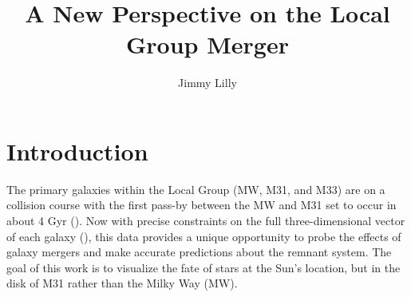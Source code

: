 \documentclass{aastex63}
\begin{document}
\title{A New Perspective on the Local Group Merger}

\author{Jimmy Lilly}


\section{Introduction} \label{sec:intro}
The primary galaxies within the Local Group (MW, M31, and M33) are on a collision course with the first pass-by between the MW and M31 set to occur in about 4 Gyr (\cite{2012ApJ...753....9V}). Now with precise constraints on the full three-dimensional vector of each galaxy (\cite{2012ApJ...753....8V}), this data provides a unique opportunity to probe the effects of galaxy mergers and make accurate predictions about the remnant system. The goal of this work is to visualize the fate of stars at the Sun's location, but in the disk of M31 rather than the Milky Way (MW).
\end{document}
